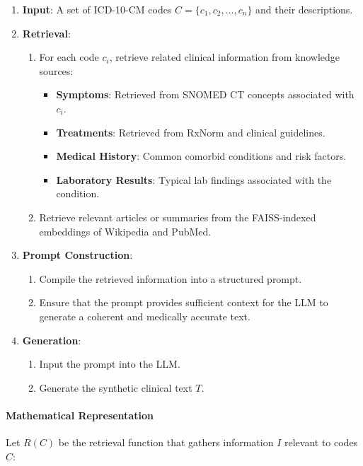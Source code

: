 \documentclass[12pt, a4paper]{article}
\begin{document}
\begin{enumerate}
    \item \textbf{Input}: A set of ICD-10-CM codes \( C = \{c_1, c_2, ..., c_n\} \) and their descriptions.
    \item \textbf{Retrieval}:
    \begin{enumerate}
        \item For each code \( c_i \), retrieve related clinical information from knowledge sources:
        \begin{itemize}
            \item \textbf{Symptoms}: Retrieved from SNOMED CT concepts associated with \( c_i \).
            \item \textbf{Treatments}: Retrieved from RxNorm and clinical guidelines.
            \item \textbf{Medical History}: Common comorbid conditions and risk factors.
            \item \textbf{Laboratory Results}: Typical lab findings associated with the condition.
        \end{itemize}
        \item Retrieve relevant articles or summaries from the FAISS-indexed embeddings of Wikipedia and PubMed.
    \end{enumerate}
    \item \textbf{Prompt Construction}:
    \begin{enumerate}
        \item Compile the retrieved information into a structured prompt.
        \item Ensure that the prompt provides sufficient context for the LLM to generate a coherent and medically accurate text.
    \end{enumerate}
    \item \textbf{Generation}:
    \begin{enumerate}
        \item Input the prompt into the LLM.
        \item Generate the synthetic clinical text \( T \).
    \end{enumerate}
\end{enumerate}

\paragraph{Mathematical Representation}

Let \( R(C) \) be the retrieval function that gathers information \( I \) relevant to codes \( C \):
\end{document}
